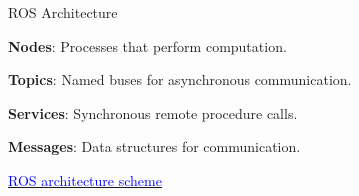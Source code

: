 \documentclass[compress]{beamer}
\begin{document}
\begin{frame}{ROS Architecture}
        
            \textbf{Nodes}: Processes that perform computation.\\   \vspace{.1cm}
            
            \textbf{Topics}: Named buses for asynchronous communication.\\ \vspace{.1cm}
            
            
            \textbf{Services}: Synchronous remote procedure calls.\\ \vspace{.1cm}
            
            
            \textbf{Messages}: Data structures for communication.\\ \vspace{.1cm}
            
            
            \vfill
            
            {\tiny \href{https://miro.medium.com/v2/format:webp/0*n7FfmKCTMjXgD7_V.gif}{\underline{\textcolor{blue}{ROS architecture scheme}}}}
\end{frame}
\end{document}
